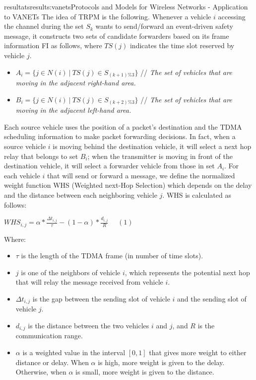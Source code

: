 \documentclass{ra2016}
\begin{document}
\begin{module}{resultats}{results:vanets}{Protocols and Models for Wireless Networks - Application to VANETs}
The idea of TRPM is the following. Whenever a vehicle $i$ accessing the channel during the set $S_k$ wants to send/forward an 
event-driven safety message, it constructs two sets of candidate forwarders based on its frame information FI as 
follows, where $TS(j)$ indicates the time slot reserved by vehicle $j$.

\begin{itemize}
    \item $A_i=\{j\in N(i)~|~TS(j)\in S_{(k+1)\%3}\}$ // \textit{The set of vehicles that are moving in the adjacent right-hand area.}
    \item $B_i=\{j\in N(i)~|~TS(j)\in S_{(k+2)\%3}\}$ // \textit{The set of vehicles that are moving in the adjacent left-hand area.}
\end{itemize}

Each source vehicle uses the position of a packet's destination and the TDMA scheduling information to make packet forwarding 
decisions. In fact, when a source vehicle $i$ is moving behind the destination vehicle, it will select a next hop relay that 
belongs to set $B_i$; when the transmitter is moving in front of the destination vehicle, it will select a forwarder vehicle 
from those in  set $A_i$. %
For each vehicle $i$ that will send or forward a message, we define the normalized weight function WHS (Weighted next-Hop 
Selection) which depends on the delay and the distance between each neighboring vehicle $j$. WHS is calculated as follows:

\begin{center}
    \vspace{2mm}
    $WHS_{i,j}=\alpha*\frac{\Delta t_{i,j}}{\tau}-(1-\alpha)*\frac{d_{i,j}}{R}~~~~~~(1)$ 
    \vspace{2mm}
\end{center}

Where:

\begin{itemize}
    \item $\tau$ is the length of the TDMA frame (in number of time slots).
    \item $j$ is one of the neighbors of vehicle $i$, which represents the potential next hop that will relay the message received from vehicle $i$.
    \item $\Delta t_{i,j}$ is the gap between the sending slot of vehicle $i$ and the sending slot of vehicle $j$.
    \item $d_{i,j}$ is the distance between the two vehicles $i$ and $j$, and $R$ is the communication range. 
    \item $\alpha$ is a weighted value in the interval $[0,1]$ that gives more weight to either distance or delay. When $\alpha$ is high, more weight is given to the delay. Otherwise, when $\alpha$ is small, more weight is given to the distance.
\end{itemize}


\end{module}
\end{document}
